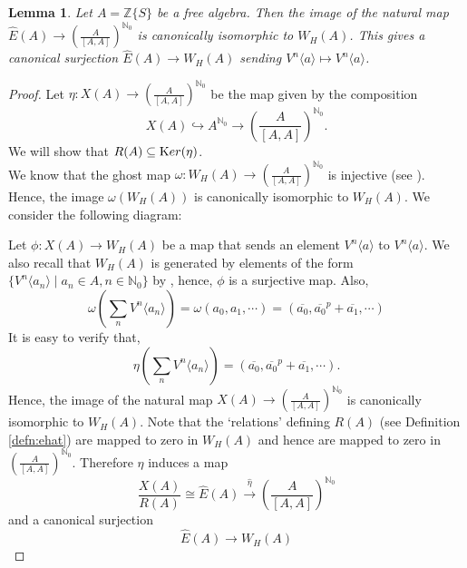 \documentclass[11pt]{amsart}
\theoremstyle{plain}
\newtheorem{lemma}[thm]{Lemma}
\theoremstyle{definition}
\newcommand{\N}{{\mathbb N}}
\newcommand{\Z}{{\mathbb Z}}
\newcommand{\ab}[1]{\langle {#1} \rangle}
\newcommand{\ac}[1]{\{#1\}}
\begin{document}
\begin{lemma}\label{imageehat} 
Let $A=\Z\ac{S}$ be a free algebra. Then the image of the natural map $\hat{E}(A) \to (\frac{A}{[A,A]})^{\N_0}$ is canonically isomorphic to $W_H(A)$. This gives a canonical surjection $\hat{E}(A) \to W_H(A)$ sending $V^n\ab{a} \mapsto V^n\ab{a}$. 
\end{lemma}

\begin{proof}
Let $\eta : X(A) \to \left(\frac{A}{[A,A]}\right)^{\N_0}$ be the map given by the composition $$X(A) \hookrightarrow A^{\N_0} \to \left(\frac{A}{[A,A]}\right)^{\N_0}.$$
 We will show that $R(A) \subseteq {\text Ker}(\eta)$.\\
\noindent We know that the ghost map $\omega: W_H(A) \to  \left(\frac{A}{[A,A]}\right)^{\N_0}$ is injective (see \cite[page 2]{h2}). Hence, the image  $\omega(W_H(A))$ is canonically isomorphic to $W_H(A)$. We consider the following diagram:
\begin{center}
\end{center}
Let $\phi: X(A) \to W_H(A)$ be  a map that sends an element $V^n\ab{a}$ to $V^n\ab{a}$. We also recall that $W_H(A)$ is generated by elements of the form $\{V^n\ab{a_n}\mid a_n \in A, n \in \N_0\}$ by \cite[Lemma 3.3]{hp},  hence, $\phi$ is a surjective map. Also, 
$$\omega(\sum_n V^n\ab{a_n}) = \omega(a_0,a_1,\cdots) = (\overline{a_0},{\overline{a_0}}^p+{\overline{a_1}}, \cdots)$$
It is easy to verify that,
$$\eta(\sum_n V^n\ab{a_n}) = (\overline{a_0},{\overline{a_0}}^p+{\overline{a_1}}, \cdots).$$
Hence, the image of the natural map $X(A) \to (\frac{A}{[A,A]})^{\N_0}$ is canonically isomorphic to $W_H(A)$. Note that the `relations' defining $R(A)$ (see Definition \ref{defn:ehat}) are mapped to zero in $W_H(A)$ and hence are mapped to zero in 
$(\frac{A}{[A,A]})^{\N_0}$. Therefore $\eta$ induces a map 
$$ \frac{X(A)}{R(A)} \cong \hat{E}(A) \xrightarrow{\hat{\eta}} \left(\frac{A}{[A,A]}\right)^{\N_0}$$
and a canonical surjection
$$ \hat{E}(A) \to W_H(A)$$
\end{proof}
\end{document}
